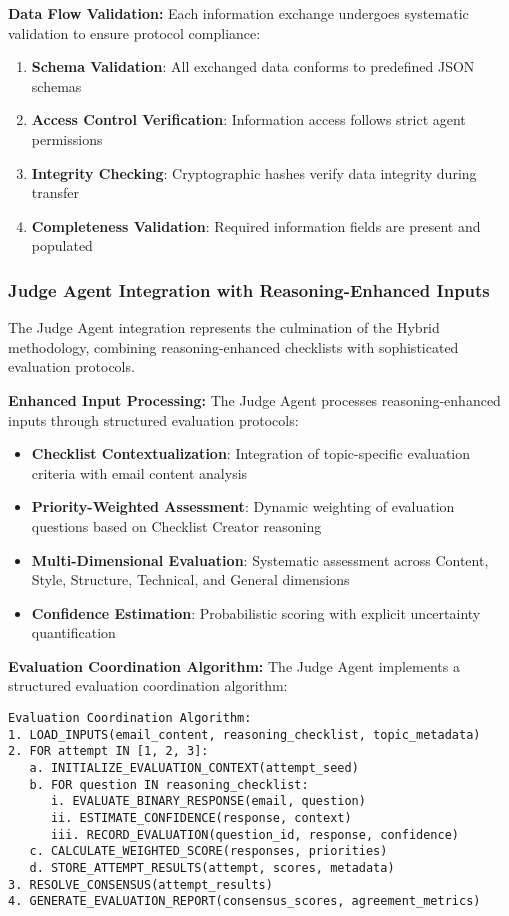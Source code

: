 \textbf{Data Flow Validation:}
Each information exchange undergoes systematic validation to ensure protocol compliance:

\begin{enumerate}
    \item \textbf{Schema Validation}: All exchanged data conforms to predefined JSON schemas
    \item \textbf{Access Control Verification}: Information access follows strict agent permissions
    \item \textbf{Integrity Checking}: Cryptographic hashes verify data integrity during transfer
    \item \textbf{Completeness Validation}: Required information fields are present and populated
\end{enumerate}

\subsubsection{Judge Agent Integration with Reasoning-Enhanced Inputs}

The Judge Agent integration represents the culmination of the Hybrid methodology, combining reasoning-enhanced checklists with sophisticated evaluation protocols.

\textbf{Enhanced Input Processing:}
The Judge Agent processes reasoning-enhanced inputs through structured evaluation protocols:

\begin{itemize}
    \item \textbf{Checklist Contextualization}: Integration of topic-specific evaluation criteria with email content analysis
    \item \textbf{Priority-Weighted Assessment}: Dynamic weighting of evaluation questions based on Checklist Creator reasoning
    \item \textbf{Multi-Dimensional Evaluation}: Systematic assessment across Content, Style, Structure, Technical, and General dimensions
    \item \textbf{Confidence Estimation}: Probabilistic scoring with explicit uncertainty quantification
\end{itemize}

\textbf{Evaluation Coordination Algorithm:}
The Judge Agent implements a structured evaluation coordination algorithm:

\begin{verbatim}
Evaluation Coordination Algorithm:
1. LOAD_INPUTS(email_content, reasoning_checklist, topic_metadata)
2. FOR attempt IN [1, 2, 3]:
   a. INITIALIZE_EVALUATION_CONTEXT(attempt_seed)
   b. FOR question IN reasoning_checklist:
      i. EVALUATE_BINARY_RESPONSE(email, question)
      ii. ESTIMATE_CONFIDENCE(response, context)
      iii. RECORD_EVALUATION(question_id, response, confidence)
   c. CALCULATE_WEIGHTED_SCORE(responses, priorities)
   d. STORE_ATTEMPT_RESULTS(attempt, scores, metadata)
3. RESOLVE_CONSENSUS(attempt_results)
4. GENERATE_EVALUATION_REPORT(consensus_scores, agreement_metrics)
\end{verbatim}

